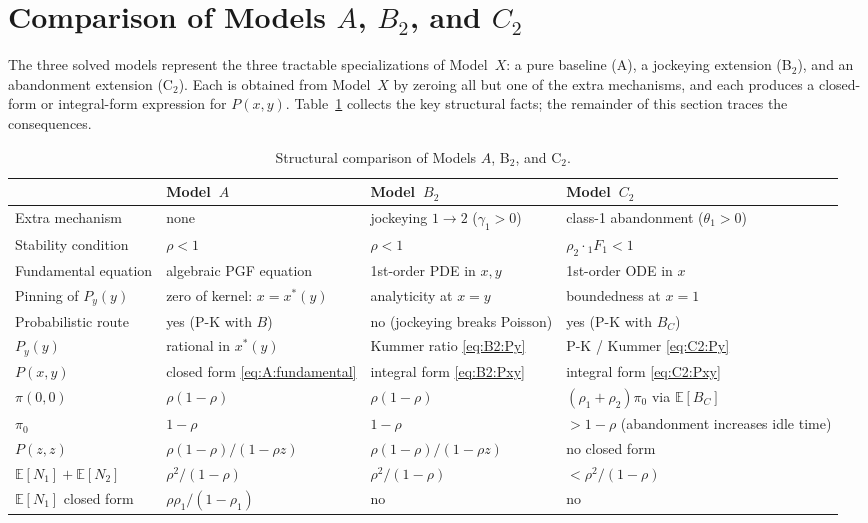 \section{Comparison of Models $A$, $B_2$, and $C_2$}
\label{sec:comparison}

The three solved models represent the three tractable specializations of
Model~$X$: a pure baseline (A), a jockeying extension (B$_2$), and an
abandonment extension (C$_2$).  Each is obtained from Model~$X$ by zeroing
all but one of the extra mechanisms, and each produces a closed-form or
integral-form expression for $P(x,y)$.  Table~\ref{tab:comparison} collects
the key structural facts; the remainder of this section traces the
consequences.

\begin{table}[H]
\centering
\caption{Structural comparison of Models $A$, B$_2$, and C$_2$.}
\label{tab:comparison}
\renewcommand{\arraystretch}{1.4}
\begin{tabular}{p{} p{} p{} p{}}
\hline
 & \textbf{Model~$A$} & \textbf{Model~$B_2$} & \textbf{Model~$C_2$} \\
\hline
Extra mechanism
 & none
 & jockeying $1\!\to\!2$ ($\gamma_1>0$)
 & class-1 abandonment ($\theta_1>0$) \\
Stability condition
 & $\rho<1$
 & $\rho<1$
 & $\rho_2\cdot{}_1F_1<1$ \\
Fundamental equation
 & algebraic PGF equation
 & 1st-order PDE in $x,y$
 & 1st-order ODE in $x$ \\
Pinning of $P_y(y)$
 & zero of kernel: $x=x^*(y)$
 & analyticity at $x=y$
 & boundedness at $x=1$ \\
Probabilistic route
 & yes (P-K with $B$)
 & no (jockeying breaks Poisson)
 & yes (P-K with $B_C$) \\
$P_y(y)$
 & rational in $x^*(y)$
 & Kummer ratio \eqref{eq:B2:Py}
 & P-K / Kummer \eqref{eq:C2:Py} \\
$P(x,y)$
 & closed form \eqref{eq:A:fundamental}
 & integral form \eqref{eq:B2:Pxy}
 & integral form \eqref{eq:C2:Pxy} \\
$\pi(0,0)$
 & $\rho(1-\rho)$
 & $\rho(1-\rho)$
 & $(\rho_1{+}\rho_2)\pi_0$ via $\mathbb{E}[B_C]$ \\
$\pi_0$
 & $1-\rho$
 & $1-\rho$
 & $>1-\rho$ (abandonment increases idle time) \\
$P(z,z)$
 & $\rho(1-\rho)/(1-\rho z)$
 & $\rho(1-\rho)/(1-\rho z)$
 & no closed form \\
$\mathbb{E}[N_1]+\mathbb{E}[N_2]$
 & $\rho^2/(1-\rho)$
 & $\rho^2/(1-\rho)$
 & $<\rho^2/(1-\rho)$ \\
$\mathbb{E}[N_1]$ closed form
 & $\rho\rho_1/(1-\rho_1)$
 & no
 & no \\
\hline
\end{tabular}
\end{table}

